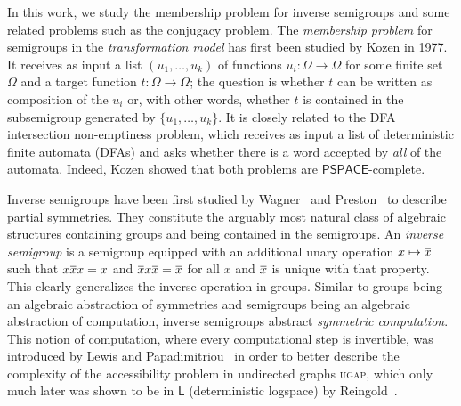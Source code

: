 \documentclass[anonymous,letter,UKenglish,cleveref,autoref,thm-restate]{lipics-v2021}
\newcommand{\LOGSPACE}{\ensuremath{\mathsf{L}}\xspace}
\newcommand{\PSPACE}{\ensuremath{\mathsf{PSPACE}}\xspace}
\newcommand\nindent{.5pt}
\newcommand\noverline[1]{\kern\nindent\overline{\kern-\nindent#1\kern-\nindent}\kern\nindent}
\newcommand{\ov}[1]{\noverline{#1}}
\theoremstyle{plain}
\theoremstyle{plain}
\newcommand{\prob}[1]{\textup{\textsc{#1}}\xspace}
\newcommand{\dUGAP}{\prob{ugap}}
\begin{document}
In this work, we study the membership problem  for inverse semigroups and some related problems such as the conjugacy problem.
The \emph{membership problem} for semigroups in the \emph{transformation model} has first been studied by Kozen \cite{koz77} in 1977.
 It receives as input a list $(u_1, \dots, u_k)$ of functions $u_i \colon \Omega \to \Omega$  for some finite set $\Omega$ and a target function $t \colon \Omega \to \Omega$; the question is whether $t$ can be written as composition of the $u_i$ or, with other words, whether $t $ is contained in the subsemigroup generated by $\{u_1, \dots, u_k\}$.
It is closely related to the DFA intersection non-emptiness problem, which receives as input a list of deterministic finite automata (DFAs) and asks whether there is a word accepted by \emph{all} of the automata.
Indeed, Kozen \cite{koz77} showed that both problems are \PSPACE-complete.

\medbreak

Inverse semigroups have been first studied by Wagner~\cite{Wagner52} and Preston~\cite{Preston54} to describe partial symmetries.
They constitute the arguably most natural class of algebraic structures containing groups and being contained in the semigroups.
An \emph{inverse semigroup} is a semigroup equipped with an additional unary operation $x \mapsto \ov x$ such that $x \ov x x = x$ and $ \ov x x \ov x = \ov x$ for all $x$ and $\ov x$ is unique with that property.
This clearly generalizes the inverse operation in groups.
Similar to groups being an algebraic abstraction of symmetries and semigroups being an algebraic abstraction of computation, inverse semigroups abstract \emph{symmetric computation}.
This notion of computation, where every computational step is invertible, was introduced by Lewis and Papadimitriou~\cite{LewisPapadimitriou82} in order to better describe the complexity of the accessibility problem in undirected graphs \dUGAP{}, which only much later was shown to be in \LOGSPACE{} (deterministic logspace) by Reingold~\cite{Reingold08}. 
\end{document}
